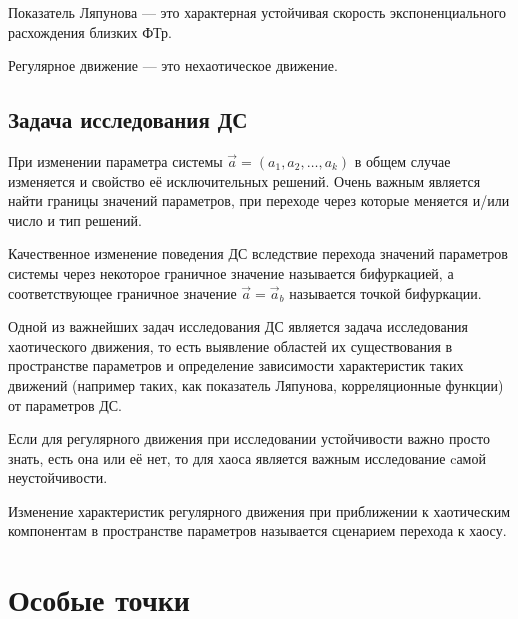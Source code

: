 \begin{definition}
	Показатель Ляпунова --- это характерная устойчивая скорость экспоненциального расхождения близких ФТр. 
\end{definition}

\begin{definition}
	Регулярное движение --- это нехаотическое движение. 
\end{definition}

\subsection{Задача исследования ДС}

При изменении параметра системы $\vec{a}=(a_1, a_2, \ldots, a_k)$ в общем случае изменяется и свойство её исключительных решений. Очень важным является найти границы значений параметров, при переходе через которые меняется и/или число и тип решений.

\begin{definition}
	Качественное изменение поведения ДС вследствие перехода значений параметров системы через некоторое граничное значение называется бифуркацией, а соответствующее граничное значение $\vec{a}=\vec{a}_b$ называется точкой бифуркации.
\end{definition}

Одной из важнейших задач исследования ДС является задача исследования хаотического движения, то есть выявление областей их существования в пространстве параметров и определение зависимости характеристик таких движений (например таких, как показатель Ляпунова, корреляционные функции) от параметров ДС.

Если для регулярного движения при исследовании устойчивости важно просто знать, есть она или её нет, то для хаоса является важным исследование cамой неустойчивости.

\begin{definition}
	Изменение характеристик регулярного движения при приближении к хаотическим компонентам в пространстве параметров называется сценарием перехода к хаосу.
\end{definition} 

\section{Особые точки}